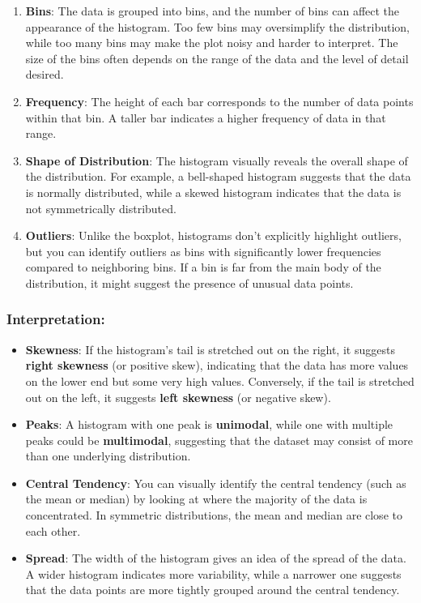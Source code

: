 \documentclass[11pt]{article}
\begin{document}
\begin{enumerate}
\def\labelenumi{\arabic{enumi}.}
\item
  \textbf{Bins}: The data is grouped into bins, and the number of bins
  can affect the appearance of the histogram. Too few bins may
  oversimplify the distribution, while too many bins may make the plot
  noisy and harder to interpret. The size of the bins often depends on
  the range of the data and the level of detail desired.
\item
  \textbf{Frequency}: The height of each bar corresponds to the number
  of data points within that bin. A taller bar indicates a higher
  frequency of data in that range.
\item
  \textbf{Shape of Distribution}: The histogram visually reveals the
  overall shape of the distribution. For example, a bell-shaped
  histogram suggests that the data is normally distributed, while a
  skewed histogram indicates that the data is not symmetrically
  distributed.
\item
  \textbf{Outliers}: Unlike the boxplot, histograms don't explicitly
  highlight outliers, but you can identify outliers as bins with
  significantly lower frequencies compared to neighboring bins. If a bin
  is far from the main body of the distribution, it might suggest the
  presence of unusual data points.
\end{enumerate}

\subsubsection{Interpretation:}\label{interpretation}

\begin{itemize}
\item
  \textbf{Skewness}: If the histogram's tail is stretched out on the
  right, it suggests \textbf{right skewness} (or positive skew),
  indicating that the data has more values on the lower end but some
  very high values. Conversely, if the tail is stretched out on the
  left, it suggests \textbf{left skewness} (or negative skew).
\item
  \textbf{Peaks}: A histogram with one peak is \textbf{unimodal}, while
  one with multiple peaks could be \textbf{multimodal}, suggesting that
  the dataset may consist of more than one underlying distribution.
\item
  \textbf{Central Tendency}: You can visually identify the central
  tendency (such as the mean or median) by looking at where the majority
  of the data is concentrated. In symmetric distributions, the mean and
  median are close to each other.
\item
  \textbf{Spread}: The width of the histogram gives an idea of the
  spread of the data. A wider histogram indicates more variability,
  while a narrower one suggests that the data points are more tightly
  grouped around the central tendency.
\end{itemize}
\end{document}
